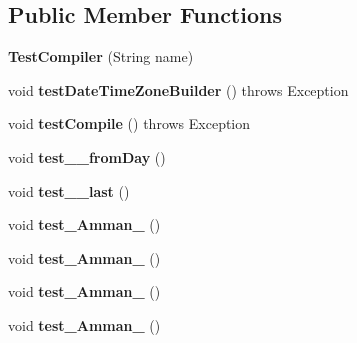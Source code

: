 \subsection*{Public Member Functions}
\begin{DoxyCompactItemize}
\item 
\hypertarget{classorg_1_1joda_1_1time_1_1tz_1_1_test_compiler_ae67d1cd6b6c74ccd92aaa4cfd8dffb68}{{\bfseries Test\-Compiler} (String name)}\label{classorg_1_1joda_1_1time_1_1tz_1_1_test_compiler_ae67d1cd6b6c74ccd92aaa4cfd8dffb68}

\item 
\hypertarget{classorg_1_1joda_1_1time_1_1tz_1_1_test_compiler_a24fb97d78197f5bd23dfaa509366dbe0}{void {\bfseries test\-Date\-Time\-Zone\-Builder} ()  throws Exception }\label{classorg_1_1joda_1_1time_1_1tz_1_1_test_compiler_a24fb97d78197f5bd23dfaa509366dbe0}

\item 
\hypertarget{classorg_1_1joda_1_1time_1_1tz_1_1_test_compiler_a7eb5cf1bb4191070be3e7abfc6dbcc21}{void {\bfseries test\-Compile} ()  throws Exception }\label{classorg_1_1joda_1_1time_1_1tz_1_1_test_compiler_a7eb5cf1bb4191070be3e7abfc6dbcc21}

\item 
\hypertarget{classorg_1_1joda_1_1time_1_1tz_1_1_test_compiler_a552ffdc8767dce08af466697d1d3e7f0}{void {\bfseries test\-\_\-\_\-from\-Day} ()}\label{classorg_1_1joda_1_1time_1_1tz_1_1_test_compiler_a552ffdc8767dce08af466697d1d3e7f0}

\item 
\hypertarget{classorg_1_1joda_1_1time_1_1tz_1_1_test_compiler_ab4d3d67b999edb63dcb1461d5ea62730}{void {\bfseries test\-\_\-\_\-last} ()}\label{classorg_1_1joda_1_1time_1_1tz_1_1_test_compiler_ab4d3d67b999edb63dcb1461d5ea62730}

\item 
\hypertarget{classorg_1_1joda_1_1time_1_1tz_1_1_test_compiler_a9baed138bb593c1237fecd59c4818273}{void {\bfseries test\-\_\-\-Amman\-\_} ()}\label{classorg_1_1joda_1_1time_1_1tz_1_1_test_compiler_a9baed138bb593c1237fecd59c4818273}

\item 
\hypertarget{classorg_1_1joda_1_1time_1_1tz_1_1_test_compiler_a2ec994a6adddd99af02ec2435858adc8}{void {\bfseries test\-\_\-\-Amman\-\_} ()}\label{classorg_1_1joda_1_1time_1_1tz_1_1_test_compiler_a2ec994a6adddd99af02ec2435858adc8}

\item 
\hypertarget{classorg_1_1joda_1_1time_1_1tz_1_1_test_compiler_a36bf5d7b05bded6cc961677b098f1ad3}{void {\bfseries test\-\_\-\-Amman\-\_} ()}\label{classorg_1_1joda_1_1time_1_1tz_1_1_test_compiler_a36bf5d7b05bded6cc961677b098f1ad3}

\item 
\hypertarget{classorg_1_1joda_1_1time_1_1tz_1_1_test_compiler_a6f8cbd9fd8608f78dddb26829516a1fa}{void {\bfseries test\-\_\-\-Amman\-\_} ()}\label{classorg_1_1joda_1_1time_1_1tz_1_1_test_compiler_a6f8cbd9fd8608f78dddb26829516a1fa}

\end{DoxyCompactItemize}
